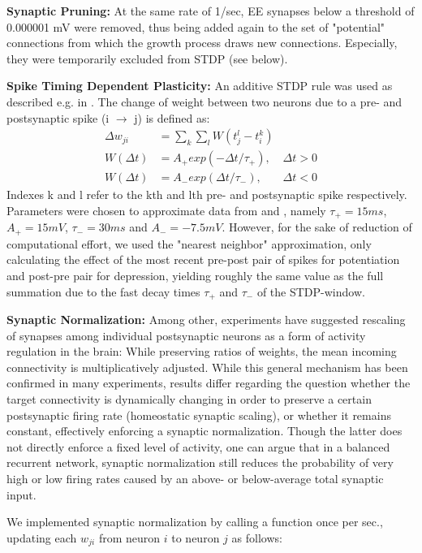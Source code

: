 \documentclass[10pt,a4paper]{article}
\begin{document}
\textbf{Synaptic Pruning:} At the same rate of 1/sec, EE synapses below a threshold of 0.000001 mV were removed, thus being added again to the set of "potential" connections from which the growth process draws new connections. Especially, they were temporarily excluded from STDP (see below).

\textbf{Spike Timing Dependent Plasticity:} An additive STDP rule was used as described e.g. in \cite{Zhang_STDP}. The change of weight between two neurons due to a pre- and postsynaptic spike (i $\rightarrow$ j) is defined as:
\begin{align}
\Delta w_{ji} &= \sum_k \sum_l W(t_j^l - t_i^k) \label{STDP_rule} \\
W(\Delta t) &= A_{+} exp(-\Delta t / \tau_{+}), & \Delta t > 0 \label{STDP_pos} \\
W(\Delta t) &= A_{-} exp(\Delta t / \tau_{-}), & \Delta t < 0 \label{STDP_neg}
\end{align}
Indexes k and l refer to the kth and lth pre- and postsynaptic spike respectively. Parameters were chosen to approximate data from \cite{Bi_Poo_STDP} and \cite{Froemke_STDP}, namely $\tau_{+} = 15 ms$, $A_{+} = 15 mV$, $\tau_{-} = 30 ms$ and $A_{-} = -7.5 mV$. However, for the sake of reduction of computational effort, we used the "nearest neighbor" approximation, only calculating the effect of the most recent pre-post pair of spikes for potentiation and post-pre pair for depression, yielding roughly the same value as the full summation due to the fast decay times $\tau_{+}$ and $\tau_{-}$ of the STDP-window.

\textbf{Synaptic Normalization:} Among other, experiments have suggested rescaling of synapses among individual postsynaptic neurons as a form of activity regulation in the brain: While preserving ratios of weights, the mean incoming connectivity is multiplicatively adjusted. While this general mechanism has been confirmed in many experiments, results differ regarding the question whether the target connectivity is dynamically changing in order to preserve a certain postsynaptic firing rate (homeostatic synaptic scaling), or whether it remains constant, effectively enforcing a synaptic normalization. Though the latter does not directly enforce a fixed level of activity, one can argue that in a balanced recurrent network, synaptic normalization still reduces the probability of very high or low firing rates caused by an above- or below-average total synaptic input.

We implemented synaptic normalization by calling a function once per sec., updating each $w_{ji}$ from neuron $i$ to neuron $j$ as follows:
\end{document}
